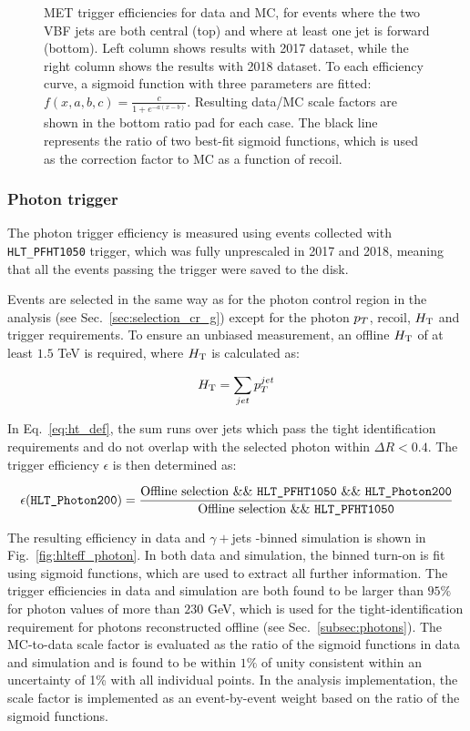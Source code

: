 \begin{figure}[ht!]
    \caption{MET trigger efficiencies for data and MC, for events where the two VBF jets are both central (top) 
    and where at least one jet is forward (bottom). Left column shows results with 2017 dataset, while the right column shows
    the results with 2018 dataset. To each efficiency curve, a sigmoid function 
    with three parameters are fitted: $f(x,a,b,c) = \frac{c}{1+e^{-a(x-b)}}$. 
    Resulting data/MC scale factors are shown in the bottom ratio pad for each case. The black line represents
    the ratio of two best-fit sigmoid functions, which is used as the correction factor to MC as a function of recoil.}
    \label{fig:sigmoid_fits_eff}
\end{figure}

\clearpage

\subsubsection{Photon trigger}
\label{subsubsec:photon_trig}

The photon trigger efficiency is measured using events collected with \texttt{HLT\_PFHT1050} 
trigger, which was fully unprescaled in 2017 and 2018, meaning that all the events passing the trigger were saved to the
disk.

Events are selected in the same way as for the photon control region in the analysis
(see Sec.~\ref{sec:selection_cr_g}) except for the photon $p_T$, recoil, $H_\mathrm{T}$ and trigger requirements. To ensure an unbiased measurement, 
an offline $H_\mathrm{T}$ of at least $1.5$ TeV is required, where $H_\mathrm{T}$ is calculated as: 

\begin{equation}
  H_\mathrm{T} = \sum_{jet} p_T^{jet}
  \label{eq:ht_def}
\end{equation}

In Eq.~\ref{eq:ht_def}, the sum runs over jets which pass the tight identification requirements 
and do not overlap with the selected photon within $\Delta R<0.4$. 
The trigger efficiency $\epsilon$ is then determined as:

$$\epsilon(\texttt{HLT\_Photon200}) = \frac{\text{Offline selection \&\& \texttt{HLT\_PFHT1050} \&\& 
\texttt{HLT\_Photon200}}}{\text{Offline selection \&\& \texttt{HLT\_PFHT1050}}} $$

The resulting efficiency in data and $\gamma +$jets \HT-binned simulation is shown in Fig.~\ref{fig:hlteff_photon}. In both data and simulation, 
the binned turn-on is fit using sigmoid functions, which are used to extract all further information. The trigger efficiencies in data and simulation are both 
found to be larger than $95\%$ for photon \pt values of more than $230$ GeV, which is used for the tight-identification requirement for photons reconstructed offline
(see Sec.~\ref{subsec:photons}). The MC-to-data scale factor is 
evaluated as the ratio of the sigmoid functions in data and simulation and is found to be within $1\%$ of unity consistent within an uncertainty of 1\% 
with all individual points. In the analysis implementation, the scale factor is implemented as an event-by-event weight based on the ratio of the sigmoid functions.

